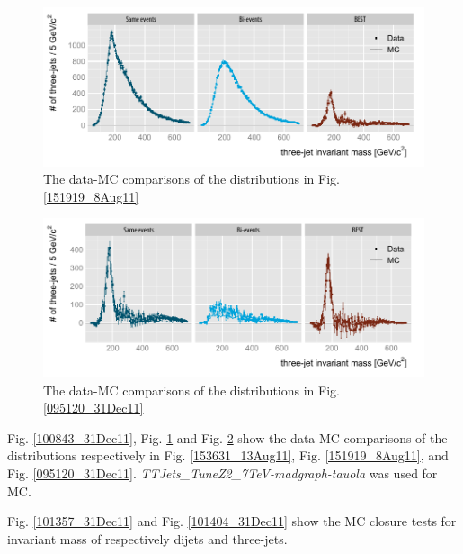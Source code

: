 \begin{figure}[!h]
 \begin{center}
  \includegraphics[scale=1.]{figs/best/c110506_s0102_g022_01}
 \caption{The data-MC comparisons of the distributions in Fig. \ref{151919_8Aug11}}
 \label{100851_31Dec11}
 \end{center}
\end{figure}

\begin{figure}[!h]
 \begin{center}
  \includegraphics[scale=1.]{figs/best/c110506_s0102_g024_01}
 \caption{The data-MC comparisons of the distributions in Fig. \ref{095120_31Dec11}}
 \label{100859_31Dec11}
 \end{center}
\end{figure}

Fig. \ref{100843_31Dec11}, Fig. \ref{100851_31Dec11} and Fig.
\ref{100859_31Dec11} show the data-MC comparisons of the distributions
respectively in Fig. \ref{153631_13Aug11}, Fig. \ref{151919_8Aug11}, and
Fig. \ref{095120_31Dec11}. \textit{TTJets\_TuneZ2\_7TeV-madgraph-tauola}
was used for MC.


Fig. \ref{101357_31Dec11} and Fig. \ref{101404_31Dec11} show the MC
closure tests for invariant mass of respectively dijets and three-jets.

